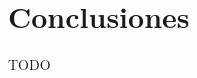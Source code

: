\documentclass[spanish]{article}
\begin{document}
    
    \section{Conclusiones}
        
      TODO  

  
  
\end{document}
